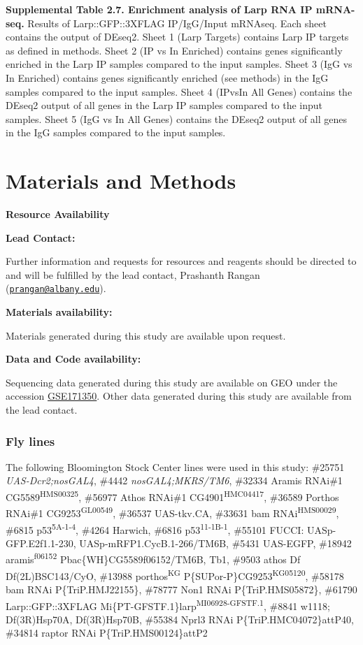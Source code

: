 \documentclass[12pt,oneside]{reedthesis}
\begin{document}
\textbf{\hfill\break
}

\textbf{Supplemental Table 2.7. Enrichment analysis of Larp RNA IP mRNA-seq.}
Results of Larp::GFP::3XFLAG IP/IgG/Input mRNAseq. Each sheet contains the output of DEseq2. Sheet 1 (Larp Targets) contains Larp IP targets as defined in methods. Sheet 2 (IP vs In Enriched) contains genes significantly enriched in the Larp IP samples compared to the input samples. Sheet 3 (IgG vs In Enriched) contains genes significantly enriched (see methods) in the IgG samples compared to the input samples. Sheet 4 (IPvsIn All Genes) contains the DEseq2 output of all genes in the Larp IP samples compared to the input samples. Sheet 5 (IgG vs In All Genes) contains the DEseq2 output of all genes in the IgG samples compared to the input samples.

\hypertarget{materials-and-methods}{%
\section{Materials and Methods}\label{materials-and-methods}}

\textbf{Resource Availability}

\textbf{Lead Contact:}

Further information and requests for resources and reagents should be directed to and will be fulfilled by the lead contact, Prashanth Rangan (\href{mailto:prangan@albany.edu}{\nolinkurl{prangan@albany.edu}}).

\textbf{Materials availability:}

Materials generated during this study are available upon request.

\textbf{Data and Code availability:}

Sequencing data generated during this study are available on GEO under the accession \href{https://www.ncbi.nlm.nih.gov/geo/query/acc.cgi?acc=GSE171350}{GSE171350}. Other data generated during this study are available from the lead contact.

\hypertarget{fly-lines}{%
\subsubsection{Fly lines}\label{fly-lines}}

The following Bloomington Stock Center lines were used in this study: \#25751 \emph{UAS-Dcr2;nosGAL4}, \#4442 \emph{nosGAL4;MKRS/TM6}, \#32334 Aramis RNAi\#1 CG5589\textsuperscript{HMS00325}, \#56977 Athos RNAi\#1 CG4901\textsuperscript{HMC04417}, \#36589 Porthos RNAi\#1 CG9253\textsuperscript{GL00549}, \#36537 UAS-tkv.CA, \#33631 bam RNAi\textsuperscript{HMS00029}, \#6815 p53\textsuperscript{5A-1-4}, \#4264 Harwich, \#6816 p53\textsuperscript{11-1B-1}, \#55101 FUCCI: UASp-GFP.E2f1.1-230, UASp-mRFP1.CycB.1-266/TM6B, \#5431 UAS-EGFP, \#18942 aramis\textsuperscript{f06152} Pbac\{WH\}CG5589f06152/TM6B, Tb1, \#9503 athos Df Df(2L)BSC143/CyO, \#13988 porthos\textsuperscript{KG} P\{SUPor-P\}CG9253\textsuperscript{KG05120}, \#58178 bam RNAi P\{TriP.HMJ22155\}, \#78777 Non1 RNAi P\{TriP.HMS05872\}, \#61790 Larp::GFP::3XFLAG Mi\{PT-GFSTF.1\}larp\textsuperscript{MI06928-GFSTF.1}, \#8841 w1118; Df(3R)Hsp70A, Df(3R)Hsp70B, \#55384 Nprl3 RNAi P\{TriP.HMC04072\}attP40, \#34814 raptor RNAi P\{TriP.HMS00124\}attP2
\end{document}
